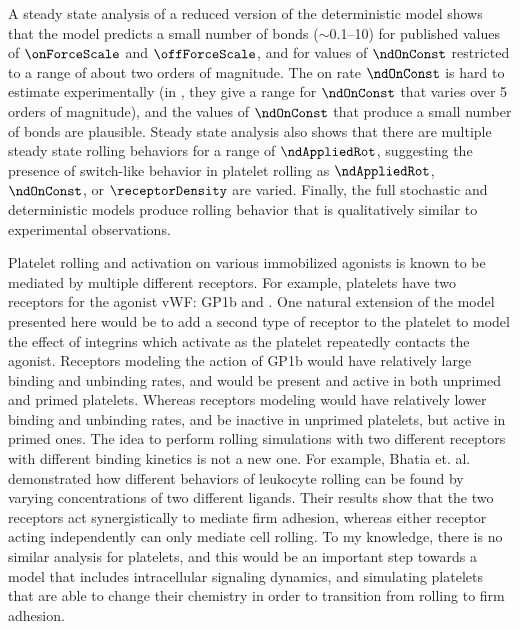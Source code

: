 A steady state analysis of a reduced version of the deterministic
model shows that the model predicts a small number of bonds
($\sim$0.1--10) for published values of $\onForceScale$ and
$\offForceScale$, and for values of $\ndOnConst$ restricted to a range
of about two orders of magnitude. The on rate $\ndOnConst$ is hard
to estimate experimentally (in \cite{Hammer1992}, they give a range
for $\ndOnConst$ that varies over 5 orders of magnitude), and the
values of $\ndOnConst$ that produce a small number of bonds are
plausible. Steady state analysis also shows that there are multiple
steady state rolling behaviors for a range of $\ndAppliedRot$,
suggesting the presence of switch-like behavior in platelet rolling as
$\ndAppliedRot$, $\ndOnConst$, or $\receptorDensity$ are
varied. Finally, the full stochastic and deterministic models produce
rolling behavior that is qualitatively similar to experimental
observations.

Platelet rolling and activation on various immobilized agonists is
known to be mediated by multiple different receptors. For example,
platelets have two receptors for the agonist vWF: GP1b and
 \cite{Bye2016,Fogelson2015,Li2010,Qiu2015}. One
natural extension of the model presented here would be to add a second
type of receptor to the platelet to model the effect of integrins
which activate as the platelet repeatedly contacts the
agonist. Receptors modeling the action of GP1b would have relatively
large binding and unbinding rates, and would be present and active in
both unprimed and primed platelets. Whereas receptors modeling
 would have relatively lower binding and unbinding
rates, and be inactive in unprimed platelets, but active in primed
ones. The idea to perform rolling simulations with two different
receptors with different binding kinetics is not a new one. For
example, Bhatia et. al. \cite{Bhatia2003} demonstrated how different
behaviors of leukocyte rolling can be found by varying concentrations
of two different ligands. Their results show that the two receptors
act synergistically to mediate firm adhesion, whereas either receptor
acting independently can only mediate cell rolling. To my knowledge,
there is no similar analysis for platelets, and this would be an
important step towards a model that includes intracellular signaling
dynamics, and simulating platelets that are able to change their
chemistry in order to transition from rolling to firm adhesion.

